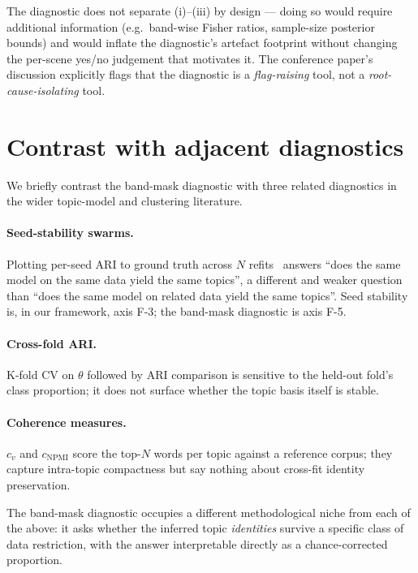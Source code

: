 \documentclass[11pt,a4paper]{article}
\begin{document}
The diagnostic does not separate (i)--(iii) by design --- doing so
would require additional information (e.g.\ band-wise Fisher ratios,
sample-size posterior bounds) and would inflate the diagnostic's
artefact footprint without changing the per-scene yes/no judgement
that motivates it. The conference paper's discussion explicitly flags
that the diagnostic is a \emph{flag-raising} tool, not a
\emph{root-cause-isolating} tool.

\section{Contrast with adjacent diagnostics}

We briefly contrast the band-mask diagnostic with three related
diagnostics in the wider topic-model and clustering literature.

\paragraph{Seed-stability swarms.} Plotting per-seed ARI to ground
truth across $N$ refits~\cite{koltchinskii2000empirical,
vinh2010information} answers ``does the same model on the same data
yield the same topics'', a different and weaker question than ``does
the same model on related data yield the same topics''. Seed
stability is, in our framework, axis F-3; the band-mask diagnostic is
axis F-5.

\paragraph{Cross-fold ARI.} K-fold CV on $\theta$ followed by ARI
comparison is sensitive to the held-out fold's class proportion; it
does not surface whether the topic basis itself is stable.

\paragraph{Coherence measures.} $c_v$ and $c_{\text{NPMI}}$
\cite{roder2015exploring} score the top-$N$ words per topic against
a reference corpus; they capture intra-topic compactness but say
nothing about cross-fit identity preservation.

The band-mask diagnostic occupies a different methodological niche
from each of the above: it asks whether the inferred topic
\emph{identities} survive a specific class of data restriction, with
the answer interpretable directly as a chance-corrected proportion.
\end{document}
